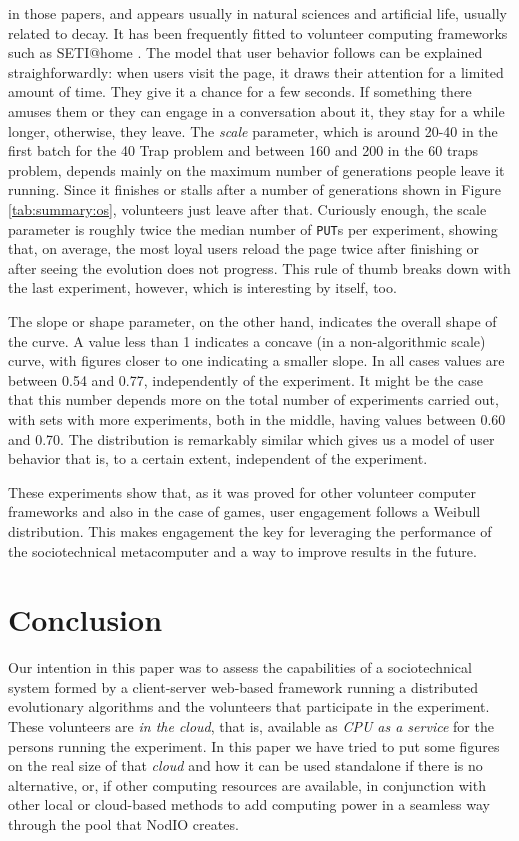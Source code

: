 \documentclass[letterpaper]{article}
\begin{document}
in those papers, and appears usually in natural sciences and
artificial life, usually related to decay. It has been frequently
fitted to volunteer computing frameworks such as SETI@home
\citep{javadi2009mining}. The model that user behavior follows can be
explained straighforwardly: when users visit the page, it draws their
attention for a limited amount of time. They give it a chance for a
few seconds. If something there amuses them or they can engage in a
conversation about it, they stay for a while longer, otherwise, they
leave. The {\em scale} parameter, which is around 20-40 in the first
batch for the 40 Trap problem and between 160 and 200 in the 60 traps
problem, depends mainly on the maximum number of generations people
leave it running. Since it finishes or stalls after a number of
generations shown in Figure \ref{tab:summary:os}, volunteers just
leave after that. Curiously enough, the scale parameter is roughly
twice the median number of {\tt PUT}s per experiment, showing that, on
average, the most loyal users reload the page twice after finishing or
after seeing the evolution does not progress. This rule of thumb
breaks down with the last experiment, however, which is interesting by
itself, too. 

The slope or shape parameter, on the other hand, indicates the overall
shape of the curve. A value less than 1 indicates a concave (in a
non-algorithmic scale) curve,
with figures closer to one indicating a smaller slope. In all cases
values are between 0.54 and 0.77, independently of the experiment. It
might be the case that this number depends more on the total number of
experiments carried out, with sets with more experiments, both in the
middle, having values between 0.60 and 0.70. The distribution is
remarkably similar which gives us a model of user behavior that is, to
a certain extent, independent of the experiment.  

These experiments show that, as it was proved for other volunteer
computer frameworks and also in the case of games, user engagement
follows a Weibull distribution. This makes engagement the key for
leveraging the performance of the sociotechnical metacomputer and a
way to improve results in the future. 

\section{Conclusion}
\label{sec:conclusion}

Our intention in this paper was to assess the capabilities of a
sociotechnical system formed by a client-server web-based framework
running a distributed evolutionary algorithms and the volunteers that
participate in the experiment. These volunteers are {\em in the
  cloud}, that is, available as {\em CPU as a service} for the persons
running the experiment. In this paper we have tried to put some figures
on the real size of that {\em cloud} and how it can be used standalone
if there is no alternative, or, if other computing resources are
available, in conjunction with other local or cloud-based methods to
add computing power in a seamless way through the pool that NodIO creates. 
\end{document}

